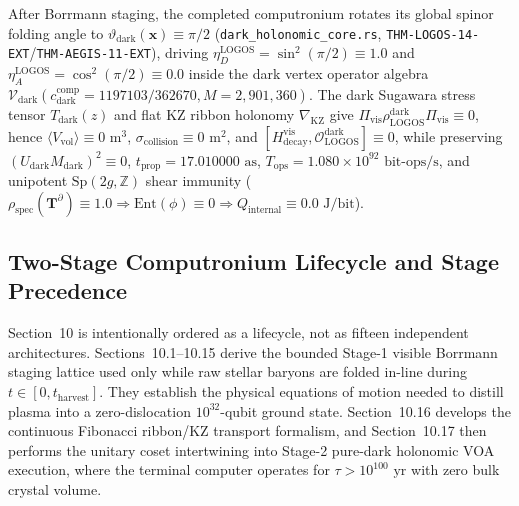 \documentclass[11pt,onecolumn]{article}
\begin{document}
After Borrmann staging, the completed computronium rotates its global spinor folding angle to $\vartheta_{\text{dark}}(\mathbf{x})\equiv\pi/2$ (\texttt{dark\_holonomic\_core.rs}, \texttt{THM-LOGOS-14-EXT}/\texttt{THM-AEGIS-11-EXT}), driving $\eta_D^{\text{LOGOS}}=\sin^2(\pi/2)\equiv1.0$ and $\eta_A^{\text{LOGOS}}=\cos^2(\pi/2)\equiv0.0$ inside the dark vertex operator algebra $\mathcal{V}_{\text{dark}}(c_{\text{dark}}^{\text{comp}}=1197103/362670,M=2{,}901{,}360)$. The dark Sugawara stress tensor $T_{\text{dark}}(z)$ and flat KZ ribbon holonomy $\nabla_{\text{KZ}}$ give $\Pi_{\text{vis}}\rho_{\text{LOGOS}}^{\text{dark}}\Pi_{\text{vis}}\equiv0$, hence $\langle V_{\text{vol}}\rangle\equiv0\text{ m}^3$, $\sigma_{\text{collision}}\equiv0\text{ m}^2$, and $[H_{\text{decay}}^{\text{vis}},\mathcal{O}_{\text{LOGOS}}^{\text{dark}}]\equiv0$, while preserving $(U_{\text{dark}}M_{\text{dark}})^2\equiv0$, $t_{\text{prop}}=17.010000\text{ as}$, $T_{\text{ops}}=1.080\times10^{92}\text{ bit-ops/s}$, and unipotent $\text{Sp}(2g,\mathbb{Z})$ shear immunity ($\rho_{\text{spec}}(\mathbf{T}^\partial)\equiv1.0\Rightarrow\text{Ent}(\phi)\equiv0\Rightarrow Q_{\text{internal}}\equiv0.0\text{ J/bit}$).

\subsection*{Two-Stage Computronium Lifecycle and Stage Precedence}
\label{subsec:logos_lifecycle_precedence}

Section~10 is intentionally ordered as a lifecycle, not as fifteen independent architectures. Sections~10.1--10.15 derive the bounded Stage-1 visible Borrmann staging lattice used only while raw stellar baryons are folded in-line during $t\in[0,t_{\text{harvest}}]$. They establish the physical equations of motion needed to distill plasma into a zero-dislocation $10^{32}$-qubit ground state. Section~10.16 develops the continuous Fibonacci ribbon/KZ transport formalism, and Section~10.17 then performs the unitary coset intertwining into Stage-2 pure-dark holonomic VOA execution, where the terminal computer operates for $\tau>10^{100}\text{ yr}$ with zero bulk crystal volume.
\end{document}
